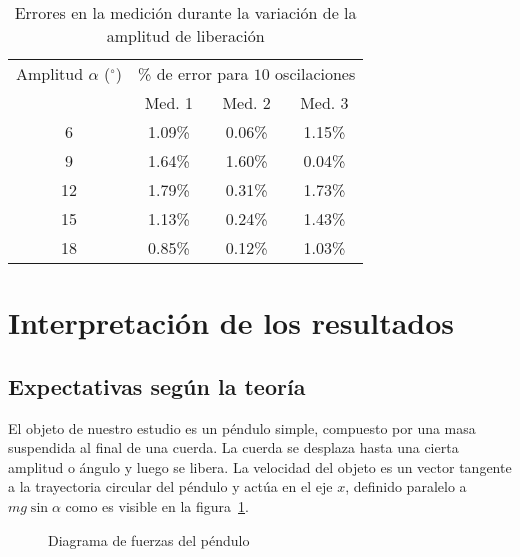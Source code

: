 \documentclass[twocolumn]{article}
\numberwithin{table}{section}
\begin{document}
\begin{table}[ht]
  \centering
  \begin{tabular}{cccc}
    \toprule
    Amplitud $\alpha$ ($^{\circ}$) & \multicolumn{3}{c}{\% de
      error para $10$
    oscilaciones} \\
    \cmidrule(lr){2-4}
    & Med. 1 & Med. 2 & Med. 3  \\
    \midrule
    6  & 1.09\% & 0.06\% & 1.15\% \\
    9  & 1.64\% & 1.60\% & 0.04\% \\
    12 & 1.79\% & 0.31\% & 1.73\% \\
    15 & 1.13\% & 0.24\% & 1.43\% \\
    18 & 0.85\% & 0.12\% & 1.03\% \\
    \bottomrule
  \end{tabular}
  \caption{Errores en la medición durante la variación de la
  amplitud de liberación}\label{tab:error_amplitud}
\end{table}

\section{Interpretación de los resultados}\label{sec:álgebra}

\subsection{Expectativas según la teoría}

El objeto de nuestro estudio es un péndulo simple, compuesto por una masa
suspendida al final de una cuerda. La cuerda se desplaza hasta una
cierta amplitud o ángulo y luego se libera. La velocidad del objeto
es un vector tangente a la trayectoria circular del péndulo y actúa
en el eje $x$, definido paralelo a $mg\sin{\alpha}$ como es visible
en la figura~\ref{fig:fuerzas}.

\begin{figure}[ht]
  \centering
  \caption{Diagrama de fuerzas del péndulo}\label{fig:fuerzas}
\end{figure}
\end{document}

